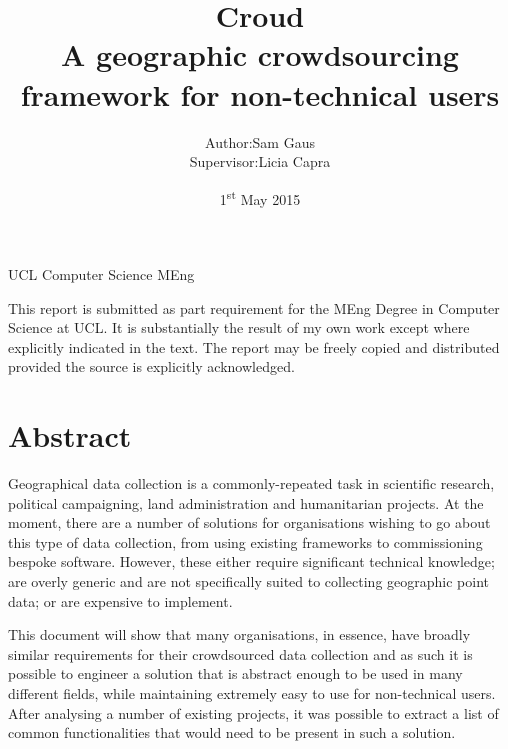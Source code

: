 \documentclass{article}
\newcommand\ssection{\clearpage\section}
\newenvironment{bottompar}{\par\vspace*{\fill}}{\clearpage}
\begin{document}
	\title{Croud \\ \vspace{2 mm} {\large A geographic crowdsourcing framework for non-technical users}}
	\author{
		\begin{tabular}{r@{ }l}
			Author:      & Sam Gaus \\[1ex]
			Supervisor: & Licia Capra \\
		\end{tabular}
	}
	\date{1\textsuperscript{st} May 2015}

	\maketitle
	\thispagestyle{empty}

	\centerline{UCL Computer Science MEng}

	\begin{bottompar}
		This report is submitted as part requirement for the MEng Degree in Computer Science at UCL. It is substantially the result of my own work except where explicitly indicated in the text. The report may be freely copied and distributed provided the source is explicitly acknowledged.
	\end{bottompar}

	\clearpage


	\tableofcontents
	\listoffigures
	\listoftables
	\listoflistings

	\ssection*{Abstract}
	\label{sec:summary}
		Geographical data collection is a commonly-repeated task in scientific research, political campaigning, land administration and humanitarian projects. At the moment, there are a number of solutions for organisations wishing to go about this type of data collection, from using existing frameworks to commissioning bespoke software. However, these either require significant technical knowledge; are overly generic and are not specifically suited to collecting geographic point data; or are expensive to implement.

		This document will show that many organisations, in essence, have broadly similar requirements for their crowdsourced data collection and as such it is possible to engineer a solution that is abstract enough to be used in many different fields, while maintaining extremely easy to use for non-technical users. After analysing a number of existing projects, it was possible to extract a list of common functionalities that would need to be present in such a solution.
\end{document}
